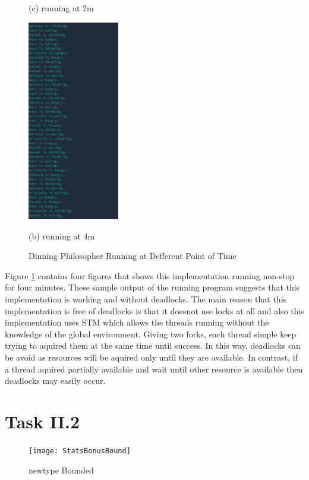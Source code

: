 \documentclass{article}
\begin{document}
\begin{normalsize}
\begin{figure}[H]
\begin{minipage}[b]{0.24\linewidth}
      \centerline{ (c) running at 2m}\medskip
    \end{minipage}
    \hfill
    \begin{minipage}[b]{0.24\linewidth}
      \centering
      \centerline{\includegraphics[width=4.0cm]{dinning4m}}
      \centerline{ (b) running at 4m}\medskip
    \end{minipage}

    \caption{Dinning Philosopher Running at Defferent Point of Time}
    \label{fig:drunning}
  \end{figure}

  Figure \ref{fig:drunning} contains four figures that shows this implementation
  running non-stop for four minutes. These sample output of the running program
  suggests that this implementation is working and without deadlocks. The main
  reason that this implementation is free of deadlocks is that it doesnot use
  locks at all and also this implementation uses STM which allows the threads
  running without the knowledge of the global environment. Giving two forks,
  each thread simple keep trying to aquired them at the same time until success.
  In this way, deadlocks can be avoid as resources will be aquired only until
  they are available. In contrast, if a thread aquired partially available and
  wait until other resource is available then deadlocks may easily occur.



  \section{Task II.2}
  
  \begin{figure}[H]
    \centering
    \centerline{\texttt{[image: StatsBonusBound]}}
    \caption{newtype Bounded}
    \label{fig:bounded}
  \end{figure}


\end{normalsize}
\end{document}
